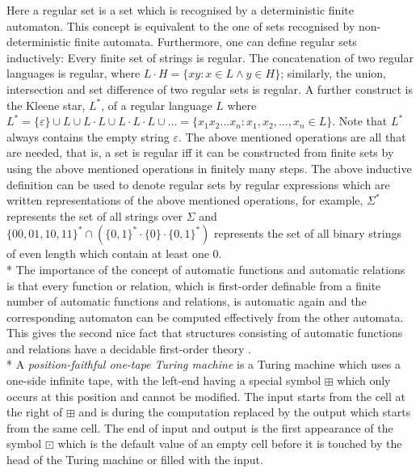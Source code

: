 \documentclass{LMCS}
\theoremstyle{plain}\newtheorem{athm}[thm]{Theorem}
\theoremstyle{plain}\newtheorem{aprop}[thm]{Proposition}
\theoremstyle{plain}\newtheorem{aprob}[thm]{Open Problem}
\theoremstyle{plain}\newtheorem{acor}[thm]{Corollary}
\theoremstyle{plain}\newtheorem{alem}[thm]{Lemma}
\theoremstyle{definition}\newtheorem{adefn}[thm]{Definition}
\theoremstyle{definition}\newtheorem{arem}[thm]{Remark}
\theoremstyle{plain}\newtheorem{aexmp}[thm]{Example}
\theoremstyle{plain}\newtheorem{aclm}[thm]{Claim}
\def\sp{\\*\indent}
\begin{document}
\noindent
Here a regular set \cite{HMU01} is a set which is recognised by a deterministic
finite automaton. This concept is equivalent to the one of sets
recognised by non-deterministic finite automata. Furthermore,
one can define regular sets inductively:
Every finite set of strings is regular. The concatenation of
two regular languages is regular, where $L \cdot H = \{xy: x \in L \wedge
y \in H\}$; similarly, the union, intersection and set difference of
two regular sets is regular. A further construct is the Kleene star,
$L^*$, of a regular language $L$ where $L^* = \{\varepsilon\} \cup L
\cup L \cdot L \cup L \cdot L \cdot L \cup \ldots = \{x_1 x_2 \ldots x_n:
x_1,x_2,\ldots,x_n \in L\}$. Note that
$L^*$ always contains the empty string $\varepsilon$. 
The above mentioned operations
are all that are needed, that is, a set is regular
iff it can be constructed from finite sets by using the above
mentioned operations in finitely many steps. 
The above inductive definition can be used
to denote regular sets by regular expressions which are written
representations of the above mentioned operations, for example,
$\Sigma^*$ represents the set of all strings over $\Sigma$ and
$\{00,01,10,11\}^* \cap (\{0,1\}^* \cdot \{0\} \cdot \{0,1\}^*)$
represents the set of all binary strings of even length which
contain at least one $0$.
\sp
The importance of the concept of automatic functions and automatic relations
is that every function or relation,
which is first-order definable from a finite number
of automatic functions and relations, is automatic again and the
corresponding automaton
can be computed effectively from the other automata. This gives the second
nice fact that structures consisting of automatic functions and relations
have a decidable first-order theory \cite{Ho83,KN95}.
\sp
A {\em position-faithful one-tape Turing machine} is a Turing
machine which uses a one-side infinite tape, with the left-end having
a special symbol $\boxplus$ which only occurs at this position and cannot
be modified. The input starts from the cell at the right 
of $\boxplus$ and is during the computation replaced by the output
which starts from the same cell. The end of input and output is the first
appearance of the symbol $\boxdot$ which is the default value of an empty
cell before it is touched by the head of the Turing machine or filled with
the input.
\end{document}
